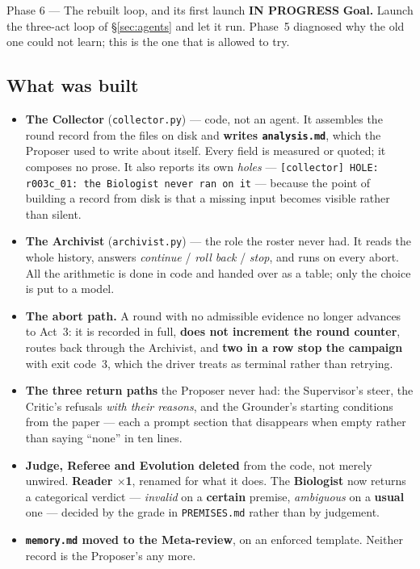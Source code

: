 \documentclass[11pt,a4paper]{article}
\newcommand{\code}[1]{\texttt{#1}}
\newcommand{\prog}{\textcolor{warn}{\textbf{IN PROGRESS}}}
\begin{document}
\begin{phasebox}{Phase 6 --- The rebuilt loop, and its first launch \hfill \prog}
\textbf{Goal.} Launch the three-act loop of \S\ref{sec:agents} and let it run. Phase~5 diagnosed
why the old one could not learn; this is the one that is allowed to try.

\subsection*{What was built}
\begin{itemize}[itemsep=1pt]
\item \textbf{The Collector} (\code{collector.py}) --- code, not an agent. It assembles the round
record from the files on disk and \textbf{writes \code{analysis.md}}, which the Proposer used to
write about itself. Every field is measured or quoted; it composes no prose. It also reports its
own \emph{holes} --- \code{[collector] HOLE: r003c\_01: the Biologist never ran on it} --- because
the point of building a record from disk is that a missing input becomes visible rather than
silent.
\item \textbf{The Archivist} (\code{archivist.py}) --- the role the roster never had. It reads the
whole history, answers \emph{continue} / \emph{roll back} / \emph{stop}, and runs on every abort.
All the arithmetic is done in code and handed over as a table; only the choice is put to a model.
\item \textbf{The abort path.} A round with no admissible evidence no longer advances to Act~3:
it is recorded in full, \textbf{does not increment the round counter}, routes back through the
Archivist, and \textbf{two in a row stop the campaign} with exit code~3, which the driver treats
as terminal rather than retrying.
\item \textbf{The three return paths} the Proposer never had: the Supervisor's steer, the Critic's
refusals \emph{with their reasons}, and the Grounder's starting conditions from the paper --- each
a prompt section that disappears when empty rather than saying ``none'' in ten lines.
\item \textbf{Judge, Referee and Evolution deleted} from the code, not merely unwired.
\textbf{Reader $\times$1}, renamed for what it does. The \textbf{Biologist} now returns a
categorical verdict --- \emph{invalid} on a \textbf{certain} premise, \emph{ambiguous} on a
\textbf{usual} one --- decided by the grade in \code{PREMISES.md} rather than by judgement.
\item \textbf{\code{memory.md} moved to the Meta-review}, on an enforced template. Neither record
is the Proposer's any more.
\end{itemize}


\end{phasebox}
\end{document}
